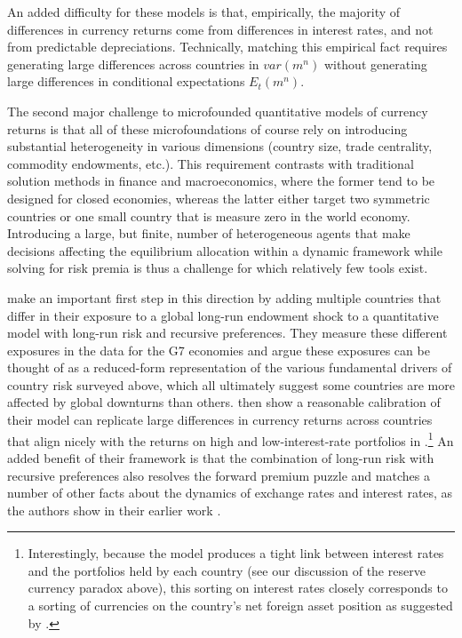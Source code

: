 \documentclass{ar-1col}
\begin{document}
An added difficulty for these models is that, empirically, the majority of differences in currency returns come from differences in interest rates, and not from predictable depreciations. Technically, matching this empirical fact requires generating large differences across countries in $var(m^n)$ without generating large differences in conditional expectations $E_t(m^n)$. 

The second major challenge to microfounded quantitative models of currency returns is that all of these microfoundations of course rely on introducing substantial heterogeneity in various dimensions (country size, trade centrality, commodity endowments, etc.). This requirement contrasts with traditional solution methods in finance and macroeconomics, where the former tend to be designed for closed economies, whereas the latter either target two symmetric countries or one small country that is measure zero in the world economy. Introducing a large, but finite, number of heterogeneous agents that make decisions affecting the equilibrium allocation within a dynamic framework while solving for risk premia is thus a challenge for which relatively few tools exist. 


\citet{colacito2018currency} make an important first step in this direction by adding multiple countries that differ in their exposure to a global long-run endowment shock to a quantitative model with long-run risk and recursive preferences. They measure these different exposures in the data for the G7 economies and argue these exposures can be thought of as a reduced-form representation of the various fundamental drivers of country risk surveyed above, which all ultimately suggest some countries are more affected by global downturns than others. \citet{colacito2018currency} then show a reasonable calibration of their model can replicate large differences in currency returns across countries that align nicely with the returns on high and low-interest-rate portfolios in \cite{LustigRoussanovVerdelhan2011}.\footnote{ Interestingly, because the model produces a tight link between interest rates and the portfolios held by each country (see our discussion of the reserve currency paradox above), this sorting on interest rates closely corresponds to a sorting of currencies on the country's net foreign asset position as suggested by \citet{DellaCorteetal2016}.} 
An added benefit of their framework is that the combination of long-run risk with recursive preferences also resolves the forward premium puzzle and matches a number of other facts about the dynamics of exchange rates and interest rates, as the authors show in their earlier work \citep{ColacitoCroce2011}. 
\end{document}
